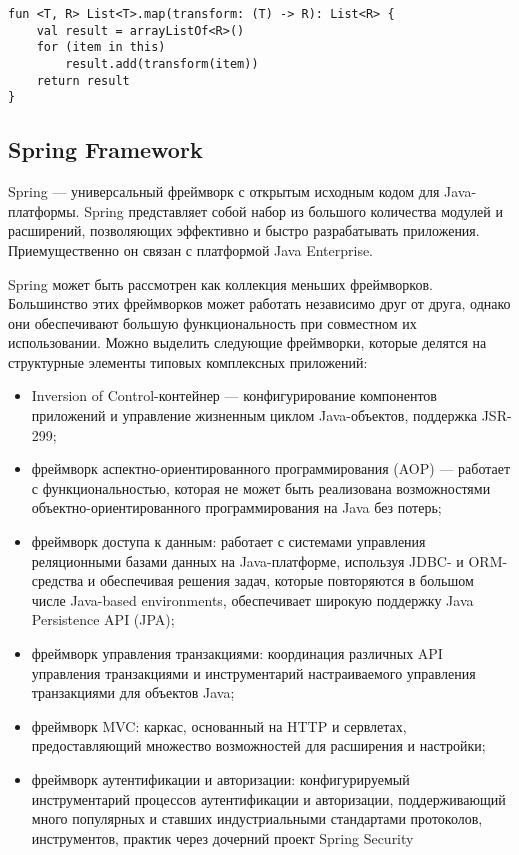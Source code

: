 \begin{lstlisting}[style = ktstyle, 
           caption = {Реализация популярной функции высшего порядка <<map>> на языке \kt{}},
           label = {lst:kt_map}]
fun <T, R> List<T>.map(transform: (T) -> R): List<R> {
    val result = arrayListOf<R>()
    for (item in this)
        result.add(transform(item))
    return result
}
\end{lstlisting}

\subsection{Spring Framework}
\label{sec:spring}

Spring --- универсальный фреймворк с открытым исходным кодом для Java-платформы. 
Spring представляет собой набор из большого количества модулей и расширений, позволяющих
эффективно и быстро разрабатывать приложения. Приемущественно он связан с платформой 
Java Enterprise.

Spring может быть рассмотрен как коллекция меньших фреймворков. Большинство этих фреймворков 
может работать независимо друг от друга, однако они обеспечивают большую функциональность при 
совместном их использовании. Можно выделить следующие фреймворки, которые делятся на структурные 
элементы типовых комплексных приложений: 
\begin{itemize}
  \item Inversion of Control-контейнер --- конфигурирование компонентов приложений и управление 
  жизненным циклом Java-объектов, поддержка JSR-299;
  \item фреймворк аспектно-ориентированного программирования (AOP) --- работает с функциональностью, 
  которая не может быть реализована возможностями объектно-ориентированного программирования на 
  Java без потерь;
  \item фреймворк доступа к данным: работает с системами управления реляционными базами данных на 
  Java-платформе, используя JDBC- и ORM-средства и обеспечивая решения задач, которые повторяются 
  в большом числе Java-based environments, обеспечивает широкую поддержку Java Persistence API (JPA);
  \item фреймворк управления транзакциями: координация различных API управления транзакциями и 
  инструментарий настраиваемого управления транзакциями для объектов Java;
  \item фреймворк MVC: каркас, основанный на HTTP и сервлетах, предоставляющий множество 
  возможностей для расширения и настройки;
  \item фреймворк аутентификации и авторизации: конфигурируемый инструментарий процессов аутентификации и 
  авторизации, поддерживающий много популярных и ставших индустриальными стандартами протоколов, 
  инструментов, практик через дочерний проект Spring Security
\end{itemize}

